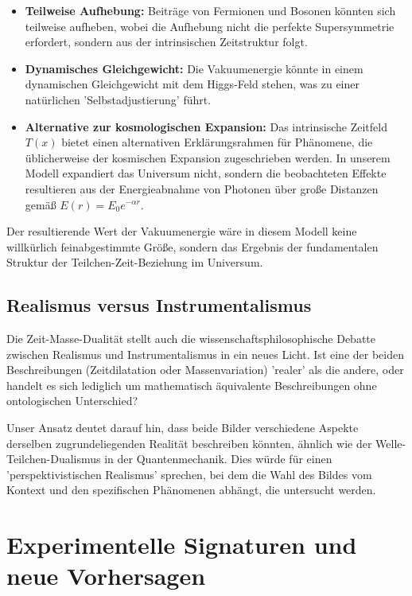 \documentclass[a4paper,12pt]{article}
\newcommand{\Tfield}{T(x)} %
\begin{document}
	\begin{itemize}
		\item \textbf{Teilweise Aufhebung:} Beiträge von Fermionen und Bosonen könnten sich teilweise aufheben, wobei die Aufhebung nicht die perfekte Supersymmetrie erfordert, sondern aus der intrinsischen Zeitstruktur folgt.
		
		\item \textbf{Dynamisches Gleichgewicht:} Die Vakuumenergie könnte in einem dynamischen Gleichgewicht mit dem Higgs-Feld stehen, was zu einer natürlichen 'Selbstadjustierung' führt.
		
		\item \textbf{Alternative zur kosmologischen Expansion:} Das intrinsische Zeitfeld $\Tfield$ bietet einen alternativen Erklärungsrahmen für Phänomene, die üblicherweise der kosmischen Expansion zugeschrieben werden. In unserem Modell expandiert das Universum nicht, sondern die beobachteten Effekte resultieren aus der Energieabnahme von Photonen über große Distanzen gemäß $E(r) = E_0 e^{-\alpha r}$.
	\end{itemize}
	
	Der resultierende Wert der Vakuumenergie wäre in diesem Modell keine willkürlich feinabgestimmte Größe, sondern das Ergebnis der fundamentalen Struktur der Teilchen-Zeit-Beziehung im Universum.
	
	\subsection{Realismus versus Instrumentalismus}
	
	Die Zeit-Masse-Dualität stellt auch die wissenschaftsphilosophische Debatte zwischen Realismus und Instrumentalismus in ein neues Licht. Ist eine der beiden Beschreibungen (Zeitdilatation oder Massenvariation) 'realer' als die andere, oder handelt es sich lediglich um mathematisch äquivalente Beschreibungen ohne ontologischen Unterschied?
	
	Unser Ansatz deutet darauf hin, dass beide Bilder verschiedene Aspekte derselben zugrundeliegenden Realität beschreiben könnten, ähnlich wie der Welle-Teilchen-Dualismus in der Quantenmechanik. Dies würde für einen 'perspektivistischen Realismus' sprechen, bei dem die Wahl des Bildes vom Kontext und den spezifischen Phänomenen abhängt, die untersucht werden.
	
	\section{Experimentelle Signaturen und neue Vorhersagen}
	
\end{document}
